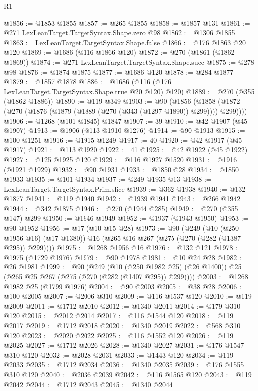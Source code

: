 \begin{lexlean}{R1}
\begin{coremodule}
@1856 := @1853 @1855
@1857 := @265 @1855
@1858 := @1857 @131
@1861 := @271 LexLeanTarget.TargetSyntax.Shape.zero @98
@1862 := @1306 @1855
@1863 := LexLeanTarget.TargetSyntax.Shape.false
@1866 := @176 @1863 @20 @120
@1869 := @1686 (@116 @1866 @120)
@1872 := @270 (@1861 (@1862 @1869))
@1874 := @271 LexLeanTarget.TargetSyntax.Shape.succ
@1875 := @278 @98
@1876 := @1874 @1875
@1877 := @1686 @120
@1878 := @284 @1877
@1879 := @1857 @1878
@1886 := @1686 (@116 (@176 LexLeanTarget.TargetSyntax.Shape.true @20 @120) @120)
@1889 := @270 (@355 (@1862 @1886))
@1890 := @119 @349
@1903 := @90
    (@1856 (@1858 (@1872 (@270 (@1876 (@1879 (@1889 (@270 (@343 (@1297 @1890)) @299)))) @299))))
@1906 := @1268 (@101 @1845) @1847
@1907 := 39
@1910 := @42 @1907 (@45 @1907)
@1913 := @1906 (@113 @1910 @1276)
@1914 := @90 @1913
@1915 := @100 @1251
@1916 := @1915 @1249
@1917 := 40
@1920 := @42 @1917 (@45 @1917)
@1921 := @113 @1920
@1922 := 41
@1925 := @42 @1922 (@45 @1922)
@1927 := @125 @1925 @120
@1929 := @116 @1927 @1520
@1931 := @1916 (@1921 @1929)
@1932 := @90 @1931
@1933 := @1850 @28
@1934 := @1850 @1933
@1935 := @101 @1934
@1937 := @249 @1935 @13
@1938 := LexLeanTarget.TargetSyntax.Prim.slice
@1939 := @362 @1938
@1940 := @132 @1877
@1941 := @119 @1940
@1942 := @1939 @1941
@1943 := @266 @1942
@1944 := @342 @1875
@1946 := @270 (@1944 @285)
@1949 := @270 (@355 @147) @299
@1950 := @1946 @1949
@1952 := @1937 (@1943 @1950)
@1953 := @90 @1952
@1956 := @17 (@10 @15 @28)
@1973 := @90
    (@249
      (@10 (@250 @1956 @16) (@17 @1380))
      @16
      (@265 @16 @267 (@275 (@270 (@282 (@1387 @295)) @299))))
@1975 := @1268 @1956 @16
@1976 := @132 @121
@1978 := @1975 (@1729 @1976)
@1979 := @90 @1978
@1981 := @10 @24 @28
@1982 := @26 @1981
@1999 := @90
    (@249
      (@10 (@250 @1982 @25) (@26 @1400))
      @25
      (@265 @25 @267 (@275 (@270 (@282 (@1407 @295)) @299))))
@2003 := @1268 @1982 @25 (@1799 @1976)
@2004 := @90 @2003
@2005 := @38 @28
@2006 := @100 @2005
@2007 := @2006 @310
@2009 := @116 @1537 @120
@2010 := @119 @2009
@2011 := @1712 @2010
@2012 := @1340 @2011
@2014 := @179 @310 @120
@2015 := @2012 @2014
@2017 := @116 @1544 @120
@2018 := @119 @2017
@2019 := @1712 @2018
@2020 := @1340 @2019
@2022 := @568 @310 @120
@2023 := @2020 @2022
@2025 := @116 @1552 @120
@2026 := @119 @2025
@2027 := @1712 @2026
@2028 := @1340 @2027
@2031 := @176 @1547 @310 @120
@2032 := @2028 @2031
@2033 := @1443 @120
@2034 := @119 @2033
@2035 := @1712 @2034
@2036 := @1340 @2035
@2039 := @176 @1555 @310 @120
@2040 := @2036 @2039
@2042 := @116 @1565 @120
@2043 := @119 @2042
@2044 := @1712 @2043
@2045 := @1340 @2044

\end{coremodule}
\end{lexlean}
